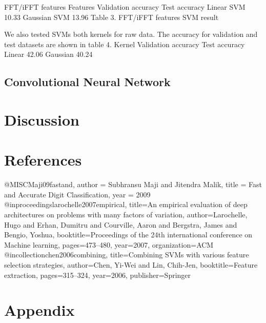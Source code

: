 \documentclass[10pt,twocolumn]{article}
\begin{document}
FFT/iFFT features
Features	Validation accuracy	Test accuracy
Linear SVM	10.33%
Gaussian SVM	13.96%
Table 3. FFT/iFFT features SVM result

We also tested SVMs both kernels for raw data. The accuracy for validation and test datasets are shown in table 4.
Kernel	Validation accuracy	Test accuracy
Linear	42.06%
Gaussian	40.24%


\subsection{Convolutional Neural Network}
\section{Discussion}
\section{References}
@MISC{Maji09fastand,
    author = {Subhransu Maji and Jitendra Malik},
    title = {Fast and Accurate Digit Classification},
    year = {2009}
}
@inproceedings{larochelle2007empirical,
  title={An empirical evaluation of deep architectures on problems with many factors of variation},
  author={Larochelle, Hugo and Erhan, Dumitru and Courville, Aaron and Bergstra, James and Bengio, Yoshua},
  booktitle={Proceedings of the 24th international conference on Machine learning},
  pages={473--480},
  year={2007},
  organization={ACM}
}
@incollection{chen2006combining,
  title={Combining SVMs with various feature selection strategies},
  author={Chen, Yi-Wei and Lin, Chih-Jen},
  booktitle={Feature extraction},
  pages={315--324},
  year={2006},
  publisher={Springer}
}

\section{Appendix}
\end{document}
